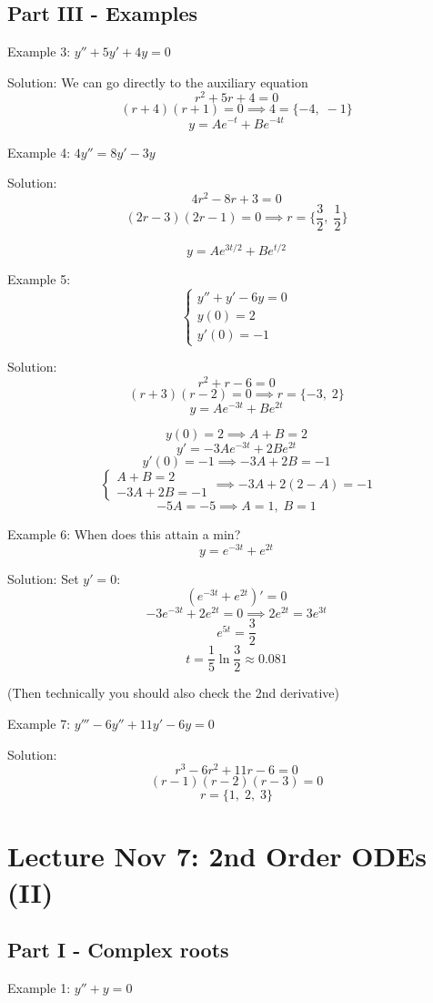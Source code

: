 \documentclass[12pt]{article}
\begin{document}
\subsection*{Part III - Examples}
Example 3: $y'' + 5y' + 4y = 0$

Solution:
We can go directly to the auxiliary equation
\[r^2 + 5r + 4 = 0\]
\[(r + 4)(r + 1) = 0 \implies 4 = \{-4, \; -1\}\]
\[\boxed{y} = Ae^{-t} + Be^{-4t}\]

Example 4: $4y'' = 8y' - 3y$

Solution:
\[4r^2 - 8r + 3 = 0\]
\[(2r - 3)(2r - 1) = 0 \implies r = \{\frac{3}{2}, \; \frac{1}{2}\}\]

\[\boxed{y = Ae^{3t/2} + Be^{t/2}}\]

Example 5:
\[\begin{cases}
    y'' + y' - 6y = 0\\
    y(0) = 2\\
    y'(0) = -1
\end{cases}\]

Solution:
\[r^2 + r - 6 = 0\]
\[(r + 3)(r - 2) = 0 \implies r = \{-3, \; 2\}\]
\[y = Ae^{-3t} + Be^{2t}\]

\[y(0) = 2 \implies A + B = 2\]
\[y' = -3Ae^{-3t} + 2Be^{2t}\]
\[y'(0) = -1 \implies -3A + 2B = -1\]
\[\begin{cases}
    A + B = 2\\
    -3A + 2B = -1
\end{cases} \implies -3A + 2(2 - A) = -1\]
\[-5A = -5 \implies A = 1, \; B = 1\]


Example 6: When does this attain a min?
\[y = e^{-3t} + e^{2t}\]

Solution:
Set $y' = 0$:
\[(e^{-3t} + e^{2t})' = 0\]
\[-3e^{-3t} + 2e^{2t} = 0 \implies 2e^{2t} = 3e^{3t}\]
\[e^{5t} = \frac{3}{2}\]
\[t = \frac{1}{5} \ln \frac{3}{2} \approx 0.081\]

(Then technically you should also check the 2nd derivative)

Example 7: $y''' - 6y'' + 11y' - 6y = 0$

Solution:
\[r^3 - 6r^2 + 11r - 6 = 0\] 
\[(r - 1)(r - 2)(r - 3) = 0\]
\[r = \{1,\; 2,\; 3\}\]

\section{Lecture Nov 7: 2nd Order ODEs (II)}
\subsection*{Part I - Complex roots}
Example 1: $y'' + y = 0$
\end{document}
